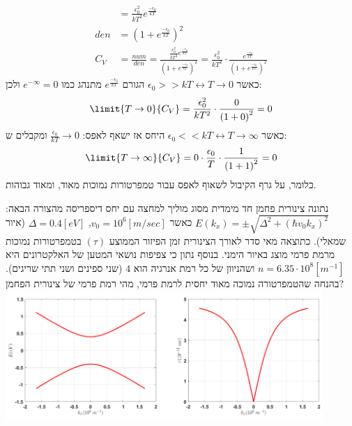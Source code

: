 \documentclass{article}
\begin{document}
\begin{Answer}
\begin{align*}
    &=\frac{\epsilon_{0}^{2}}{kT^{2}}e^{\frac{-\epsilon_{0}}{kT}}\\
    den &= \left( 1+e^{\frac{-\epsilon_{0}}{kT}} \right)^{2}\\
    C_{V}&=\frac{num}{den}=\frac{\frac{\epsilon_{0}^{2}}{kT^{2}}e^{\frac{-\epsilon_{0}}{kT}}}{\left( 1+e^{\frac{-\epsilon_{0}}{kT}} \right)^{2}}=\frac{\epsilon_{0}^{2}}{kT^{2}}\cdot\frac{e^{\frac{-\epsilon_{0}}{kT}}}{\left( 1+e^{\frac{-\epsilon_{0}}{kT}} \right)^{2}}
\end{align*}
כאשר $\epsilon_{0}>>kT \leftrightarrow T\to0$ הגורם $e^{\frac{-\epsilon_{0}}{kT}}$ מתנהג כמו $e^{-\infty}=0$ ולכן:
$$\limit{T\to0}{C_{V}}=\frac{\epsilon_{0}^{2}}{kT^{2}}\cdot\frac{0}{\left( 1+0 \right)^{2}}=0$$
כאשר $\epsilon_{0}<<kT \leftrightarrow T\to\infty$ היחס אז ישאף לאפס: ${\frac{\epsilon_{0}}{kT}}\to0$ ומקבלים ש:
$$\limit{T\to\infty}{C_{V}}=0\cdot\frac{\epsilon_{0}}{T}\cdot\frac{1}{\left( 1+1 \right)^{2}}=0$$
כלומר, על גרף הקיבול לשאוף לאפס עבור טמפרטורות נמוכות מאוד, ומאוד גבוהות.
\end{Answer}
\begin{Question}
נתונה צינורית פחמן חד מימדית מסוג מוליך למחצה עם יחס דיספריסה מהצורה הבאה:
$E\left( k_{x} \right)=\pm\sqrt{\Delta^{2}+\left( \hbar v_{0}k_{x} \right)^{2}}$ כאשר $v_{0}=10^{6}\left[ m/sec \right]$, $\Delta=0.4\left[ eV \right]$ (איור שמאלי). כתוצאה מאי סדר לאורך הצינורית זמן הפיזור הממוצע $\left( \tau \right)$ בטמפרטורות נמוכות מרמת פרמי מוצג באיור הימני. בנוסף נתון כי צפיפות נושאי המטען של האלקטרונים היא $n=6.35\cdot 10^{8}\left[ m^{-1} \right]$ ושהניוון של כל רמת אנרגיה הוא $4$ (שני ספינים ושני תתי שריגים). בהנחה שהטמפרטורה נמוכה מאוד יחסית לרמת פרמי, מהי רמת פרמי של צינורית הפחמן?\\
\includegraphics[width=0.9\textwidth]{image/Q4figure.png}
\end{Question}
\end{document}
